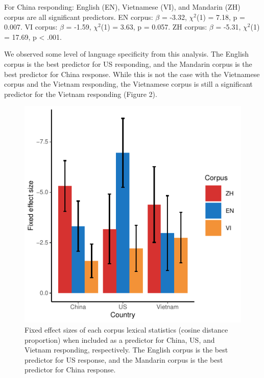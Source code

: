 \documentclass[10pt, letterpaper]{article}
\newenvironment{CodeChunk}{}{}
\begin{document}
For China responding: English (EN), Vietnamese (VI), and Mandarin (ZH)
corpus are all significant predictors. EN corpus: \(\beta\) = -3.32,
\(\chi^2\)(1) = 7.18, p = 0.007. VI corpus: \(\beta\) = -1.59,
\(\chi^2\)(1) = 3.63, p = 0.057. ZH corpus: \(\beta\) = -5.31,
\(\chi^2\)(1) = 17.69, p \textless{} .001.

We observed some level of language specificity from this analysis. The
English corpus is the best predictor for US responding, and the Mandarin
corpus is the best predictor for China response. While this is not the
case with the Vietnamese corpus and the Vietnam responding, the
Vietnamese corpus is still a significant predictor for the Vietnam
responding (Figure 2).

\begin{CodeChunk}
\begin{figure}[tb]

{\centering \includegraphics{figs/unnamed-chunk-3-1} 

}

\caption[Fixed effect sizes of each corpus lexical statistics (cosine distance proportion) when included as a predictor for China, US, and Vietnam responding, respectively]{Fixed effect sizes of each corpus lexical statistics (cosine distance proportion) when included as a predictor for China, US, and Vietnam responding, respectively. The English corpus is the best predictor for US response, and the Mandarin corpus is the best predictor for China response.}\label{fig:unnamed-chunk-3}
\end{figure}
\end{CodeChunk}
\end{document}
